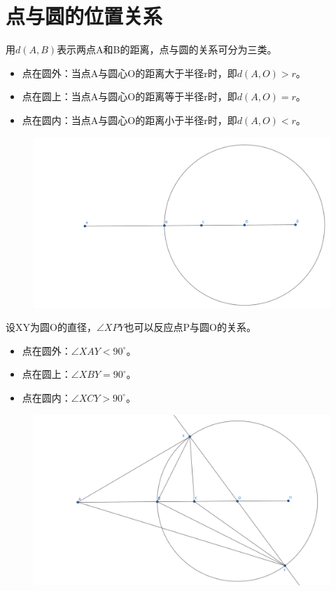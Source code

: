 \section{点与圆的位置关系}
用$d(A,B)$表示两点A和B的距离，点与圆的关系可分为三类。
\begin{itemize}
    \item 点在圆外：当点A与圆心O的距离大于半径r时，即$d(A,O) > r$。
    \item 点在圆上：当点A与圆心O的距离等于半径r时，即$d(A,O) = r$。
    \item 点在圆内：当点A与圆心O的距离小于半径r时，即$d(A,O) < r$。
\end{itemize}
\begin{figure}[H]
    \centering
    \includegraphics[width=0.8\linewidth]{figures/点与圆.png}
\end{figure}

设XY为圆O的直径，$\angle XPY$也可以反应点P与圆O的关系。
\begin{itemize}
    \item 点在圆外：$\angle XAY< 90^\circ$。
    \item 点在圆上：$\angle XBY= 90^\circ$。
    \item 点在圆内：$\angle XCY > 90^\circ$。
\end{itemize}
\begin{figure}[H]
    \centering
    \includegraphics[width=0.8\linewidth]{figures/点与圆2.png}
\end{figure}

